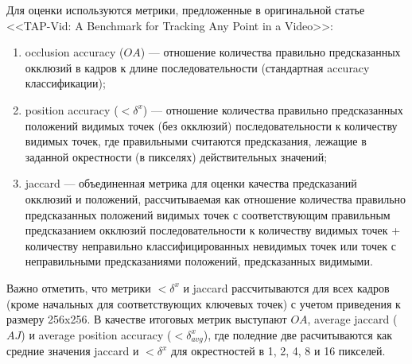 \documentclass[a4paper, 14pt]{extarticle}
\theoremstyle{definition}
\theoremstyle{plain}
\theoremstyle{remark}
\begin{document}
Для оценки используются метрики, предложенные в оригинальной статье <<TAP-Vid: A Benchmark for Tracking Any Point in a Video>>: 
\begin{enumerate}
    \item occlusion accuracy ($OA$) --- отношение количества правильно предсказанных окклюзий в  кадров к длине последовательности (стандартная accuracy классификации);
    \item position accuracy ($<\delta^x$) --- отношение количества правильно предсказанных положений видимых точек (без окклюзий) последовательности к количеству видимых точек, где правильными считаются предсказания, лежащие в заданной окрестности (в пикселях) действительных значений;
    \item jaccard --- объединенная метрика для оценки качества предсказаний окклюзий и положений, рассчитываемая как отношение количества правильно предсказанных положений видимых точек с соответствующим правильным предсказанием окклюзий последовательности к количеству видимых точек + количеству неправильно классифицированных невидимых точек или точек с неправильными предсказаниями положений, предсказанных видимыми.
\end{enumerate}
Важно отметить, что метрики $<\delta^x$ и jaccard рассчитываются для всех кадров (кроме начальных для соответствующих ключевых точек) с учетом приведения к размеру 256x256.
В качестве итоговых метрик выступают $OA$, average jaccard ($AJ$) и average position accuracy ($<\delta^x_{avg}$), где поледние две расчитываются как средние значения jaccard и $<\delta^x$ для окрестностей в 1, 2, 4, 8 и 16 пикселей.
\end{document}
